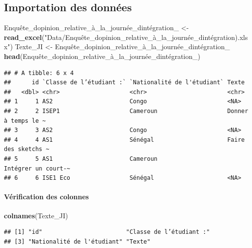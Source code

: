 \documentclass[
]{article}
\newenvironment{Shaded}{\begin{snugshade}}{\end{snugshade}}
\newcommand{\FunctionTok}[1]{\textcolor[rgb]{0.13,0.29,0.53}{\textbf{#1}}}
\newcommand{\NormalTok}[1]{#1}
\newcommand{\OtherTok}[1]{\textcolor[rgb]{0.56,0.35,0.01}{#1}}
\newcommand{\StringTok}[1]{\textcolor[rgb]{0.31,0.60,0.02}{#1}}
\begin{document}
\subsection{Importation des données}\label{importation-des-donnuxe9es}

\begin{Shaded}
\begin{Highlighting}[]
\NormalTok{Enquête\_dopinion\_relative\_à\_la\_journée\_dintégration\_ }\OtherTok{\textless{}{-}} \FunctionTok{read\_excel}\NormalTok{(}\StringTok{"Data/Enquête\_dopinion\_relative\_à\_la\_journée\_dintégration).xlsx"}\NormalTok{)}
\NormalTok{Texte\_JI }\OtherTok{\textless{}{-}}\NormalTok{ Enquête\_dopinion\_relative\_à\_la\_journée\_dintégration\_}
\FunctionTok{head}\NormalTok{(Enquête\_dopinion\_relative\_à\_la\_journée\_dintégration\_)}
\end{Highlighting}
\end{Shaded}

\begin{verbatim}
## # A tibble: 6 x 4
##      id `Classe de l’étudiant :` `Nationalité de l'étudiant` Texte              
##   <dbl> <chr>                    <chr>                       <chr>              
## 1     1 AS2                      Congo                       <NA>               
## 2     2 ISEP1                    Cameroun                    Donner à temps le ~
## 3     3 AS2                      Congo                       <NA>               
## 4     4 AS1                      Sénégal                     Faire des sketchs ~
## 5     5 AS1                      Cameroun                    Intégrer un court-~
## 6     6 ISE1 Eco                 Sénégal                     <NA>
\end{verbatim}

\paragraph{Vérification des
colonnes}\label{vuxe9rification-des-colonnes}

\begin{Shaded}
\begin{Highlighting}[]
\FunctionTok{colnames}\NormalTok{(Texte\_JI)}
\end{Highlighting}
\end{Shaded}

\begin{verbatim}
## [1] "id"                        "Classe de l’étudiant :"   
## [3] "Nationalité de l'étudiant" "Texte"
\end{verbatim}
\end{document}
